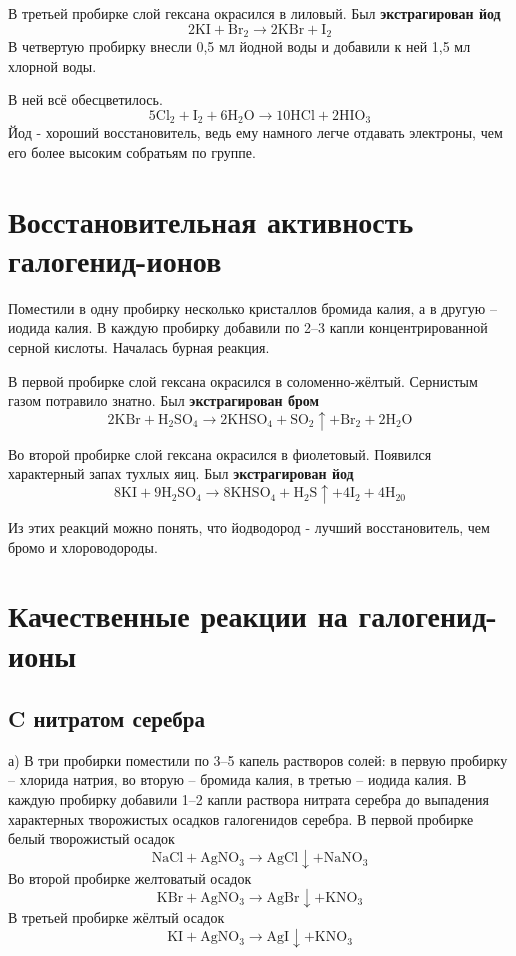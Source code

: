\documentclass[a4paper,12pt]{article}
\begin{document}
В третьей пробирке слой гексана окрасился в лиловый. Был \textbf{экстрагирован йод}
\begin{equation} 
\mathrm{2KI+ Br_2  \longrightarrow 2KBr + I_2} 
\end{equation}
В четвертую пробирку внесли 0,5 мл йодной воды и добавили к ней 1,5 мл хлорной воды.


В ней всё обесцветилось.
\begin{equation} 
\mathrm{5Cl_2 + I_2 + 6H_2O \longrightarrow 10HCl + 2HIO_3} 
\end{equation}
Йод - хороший восстановитель, ведь ему намного легче отдавать электроны, чем его более высоким собратьям по группе. 
\section{Восстановительная активность галогенид-ионов}
Поместили в одну пробирку несколько кристаллов бромида калия, а в другую – иодида калия.
В каждую пробирку добавили по 2–3 капли концентрированной серной кислоты. Началась бурная
реакция.

В первой пробирке слой гексана окрасился в соломенно-жёлтый. Сернистым газом потравило знатно. Был \textbf{экстрагирован бром}
\begin{equation} 
\mathrm{2KBr+ H_2SO_4  \longrightarrow 2KHSO_4 + SO_2\uparrow + Br_2 +2H_2O} 
\end{equation}

Во второй пробирке слой гексана окрасился в фиолетовый. Появился характерный запах тухлых яиц. Был \textbf{экстрагирован йод}
\begin{equation} 
\mathrm{8KI + 9H_2SO_4  \longrightarrow 8KHSO_4 +H_2S \uparrow + 4I_2 +4H_20}
\end{equation}

Из этих реакций можно понять, что йодводород - лучший восстановитель, чем бромо и хлороводороды.
\section{Качественные реакции на галогенид-ионы}
\subsection{C нитратом серебра}
а) В три пробирки поместили по 3–5 капель растворов солей: в первую пробирку – хлорида
натрия, во вторую – бромида калия, в третью – иодида калия. В каждую пробирку добавили 1–2
капли раствора нитрата серебра до выпадения характерных творожистых осадков галогенидов
серебра. 
В первой пробирке белый творожистый осадок
\begin{equation} 
\mathrm{NaCl + AgNO_3  \longrightarrow AgCl\downarrow + NaNO_3 } 
\end{equation}
Во второй пробирке желтоватый осадок
\begin{equation} 
\mathrm{KBr + AgNO_3  \longrightarrow AgBr\downarrow + KNO_3 } 
\end{equation}
В третьей пробирке жёлтый осадок
\begin{equation} 
\mathrm{KI + AgNO_3  \longrightarrow AgI\downarrow + KNO_3 } 
\end{equation}
\end{document}
